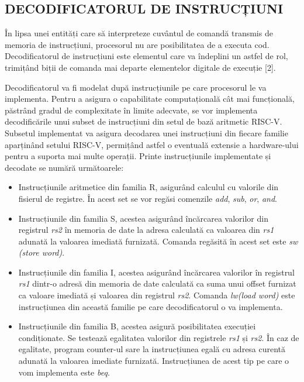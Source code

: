 \documentclass[12pt]{article}
\begin{document}
\subsection{DECODIFICATORUL DE INSTRUCȚIUNI}
 În lipsa unei entități care să interpreteze cuvântul de comandă transmis de memoria de instrucțiuni, procesorul nu are posibilitatea de a executa cod. Decodificatorul de instrucțiuni este elementul care va îndeplini un astfel de rol, trimițând biții de comanda mai departe elementelor digitale de execuție [2].
 
 Decodificatorul va fi modelat după instrucțiunile pe care procesorul le va implementa. Pentru a asigura o capabilitate computațională cât mai funcțională, păstrând gradul de complexitate în limite adecvate, se vor implementa decodificările unui subset de instrucțiuni din setul de bază aritmetic RISC-V. Subsetul implementat va asigura decodarea unei instrucțiuni din fiecare familie aparținând setului RISC-V, permițând astfel o eventuală extensie a hardware-ului pentru a suporta mai multe operații. Printe instrucțiunile implementate și decodate se numără următoarele:
 
 \begin{itemize}
\item Instrucțiunile aritmetice din familia R, asigurând calculul cu valorile din fisierul de registre. În acest set se vor regăsi comenzile \textit{add}, \textit{sub}, \textit{or}, \textit{and}.
\item Instrucțiunile din familia S, acestea asigurând încărcarea valorilor din registrul  \textit{rs2} în memoria de date la adresa calculată ca valoarea din  \textit{rs1} adunată la valoarea imediată furnizată. Comanda regăsită în acest set este \textit{sw (store word)}.
\item Instrucțiunile din familia I, acestea asigurând încărcarea valorilor în registrul \textit{rs1} dintr-o adresă din memoria de date calculată ca suma unui offset furnizat ca valoare imediată și valoarea din registrul \textit{rs2}. Comanda \textit{lw(load word)} este instrucțiunea din această familie pe care decodificatorul o va implementa.
\item Instrucțiunile din familia B, acestea asigură posibilitatea execuției condiționate. Se testează egalitatea valorilor din registrele  \textit{rs1} și  \textit{rs2}. În caz de egalitate, program counter-ul sare la instrucțiunea egală cu adresa curentă adunată la valoarea imediate furnizată. Instrucțiunea de acest tip pe care o vom implementa este  \textit{beq}.
\end{itemize}
\end{document}
